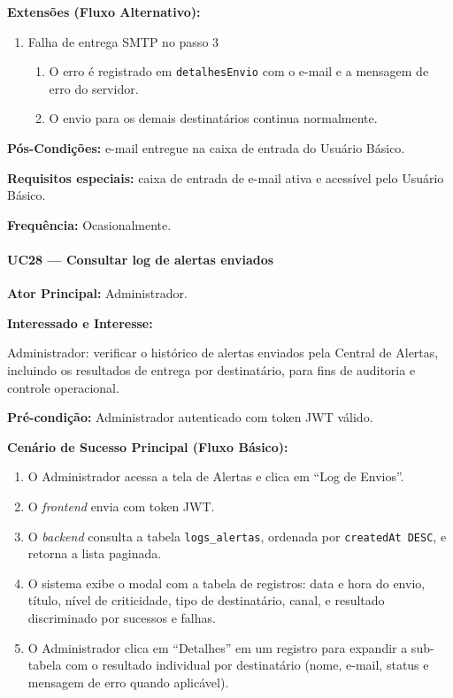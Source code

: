 \textbf{Extensões (Fluxo Alternativo):}

\begin{enumerate}
  \renewcommand{\theenumi}{3a}
  \renewcommand{\labelenumi}{\theenumi.}
  \item Falha de entrega SMTP no passo 3
  \begin{enumerate}
  \item O erro é registrado em \texttt{detalhesEnvio}
        com o e-mail e a mensagem de erro do servidor.
  \item O envio para os demais destinatários continua
        normalmente.
  \end{enumerate}
\end{enumerate}

\textbf{Pós-Condições:} e-mail entregue na caixa de
entrada do Usuário Básico.

\textbf{Requisitos especiais:} caixa de entrada de e-mail
ativa e acessível pelo Usuário Básico.

\textbf{Frequência:} Ocasionalmente.


\paragraph{UC28 --- Consultar log de alertas enviados}\hfill\break

\textbf{Ator Principal:} Administrador.

\textbf{Interessado e Interesse:}

Administrador: verificar o histórico de alertas enviados pela
Central de Alertas, incluindo os resultados de entrega por
destinatário, para fins de auditoria e controle operacional.

\textbf{Pré-condição:} Administrador autenticado com token JWT
válido.

\textbf{Cenário de Sucesso Principal (Fluxo Básico):}
\begin{enumerate}
  \item O Administrador acessa a tela de Alertas e clica
        em ``Log de Envios''.
  \item O \textit{frontend} envia
        com token JWT.
  \item O \textit{backend} consulta a tabela
        \texttt{logs\_alertas}, ordenada por
        \texttt{createdAt DESC}, e retorna a lista paginada.
  \item O sistema exibe o modal com a tabela de registros:
        data e hora do envio, título, nível de criticidade,
        tipo de destinatário, canal, e resultado discriminado
        por sucessos e falhas.
  \item O Administrador clica em ``Detalhes'' em um
        registro para expandir a sub-tabela com o resultado
        individual por destinatário (nome, e-mail, status e
        mensagem de erro quando aplicável).
\end{enumerate}

